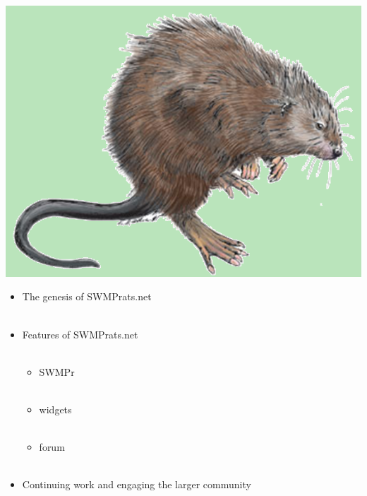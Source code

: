 \documentclass[serif]{beamer}\usepackage[]{graphicx}\usepackage[]{color}
\begin{document}
\begin{frame}{\includegraphics[width=0.05\paperwidth]{fig/muskrat.png}\hspace{0.07in}{\bf Overview}}
\begin{itemize}
\item The genesis of SWMPrats.net\\~\\
\item Features of SWMPrats.net \\~\\
\begin{itemize}
\item SWMPr \\~\\
\item widgets \\~\\
\item forum \\~\\
\end{itemize}
\item Continuing work and engaging the larger community
\end{itemize}
\end{frame}
\end{document}
